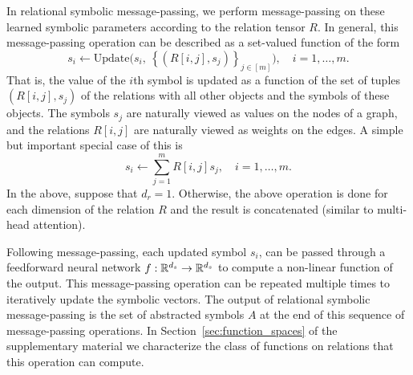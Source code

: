 In relational symbolic message-passing, we perform message-passing on these learned symbolic parameters according to the relation tensor $R$. In general, this message-passing operation can be described as a set-valued function of the form
\begin{equation}
    \label{eq:symbolic_message_passing}
    s_i \leftarrow \text{Update}\Big( s_i, \ \left\{ \left(R[i,j], s_j\right)\right\}_{j\in[m]}\Big), \quad i = 1, \ldots, m.
\end{equation}
That is, the value of the $i$th symbol is updated as a function of the set of tuples $(R[i,j], s_j)$ of the relations with all other objects and the symbols of these objects. The symbols $s_j$ are naturally viewed
as values on the nodes of a graph, and the relations $R[i,j]$ are naturally viewed as weights on the edges. A simple but important special case of this is
\begin{equation}
    \label{eq:linear_symbolic_mp}
    s_i \leftarrow \sum_{j=1}^{m} R[i,j] s_j, \quad i=1, \ldots, m.
\end{equation}
In the above, suppose that $d_r = 1$. Otherwise, the above operation is done for each dimension of the relation $R$ and the result is concatenated (similar to multi-head attention).

Following message-passing, each updated symbol $s_i$, can be passed through a feedforward neural network $f:\mathbb{R}^{d_s}\rightarrow \mathbb{R}^{d_s}$ to compute a non-linear function of the output. %
This message-passing operation can be repeated multiple times to iteratively update the symbolic vectors.  The output of relational symbolic message-passing is the set of abstracted symbols $A$ at the end of this sequence of message-passing operations. %
In Section~\ref{sec:function_spaces} of the supplementary material we characterize the class of functions on relations that this operation can compute.

